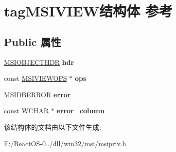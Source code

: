 \hypertarget{structtag_m_s_i_v_i_e_w}{}\section{tag\+M\+S\+I\+V\+I\+E\+W结构体 参考}
\label{structtag_m_s_i_v_i_e_w}
\subsection*{Public 属性}
\begin{DoxyCompactItemize}
\item 
\mbox{\label{structtag_m_s_i_v_i_e_w_a8402b9c847ac7905c660a1b94c889cce}} 
\hyperlink{structtag_m_s_i_o_b_j_e_c_t_h_d_r}{M\+S\+I\+O\+B\+J\+E\+C\+T\+H\+DR} {\bfseries hdr}
\item 
\mbox{\label{structtag_m_s_i_v_i_e_w_a3023150ee9ab42d9b7b71bc37b87c23f}} 
const \hyperlink{structtag_m_s_i_v_i_e_w_o_p_s}{M\+S\+I\+V\+I\+E\+W\+O\+PS} $\ast$ {\bfseries ops}
\item 
\mbox{\label{structtag_m_s_i_v_i_e_w_a094d7d1c12277b252f0b88352cfc3436}} 
M\+S\+I\+D\+B\+E\+R\+R\+OR {\bfseries error}
\item 
\mbox{\label{structtag_m_s_i_v_i_e_w_a09715c2c5cec7f35f7fa6f2a38af59e5}} 
const W\+C\+H\+AR $\ast$ {\bfseries error\+\_\+column}
\end{DoxyCompactItemize}


该结构体的文档由以下文件生成\+:\begin{DoxyCompactItemize}
\item 
E\+:/\+React\+O\+S-\/0../dll/win32/msi/msipriv.\+h\end{DoxyCompactItemize}
